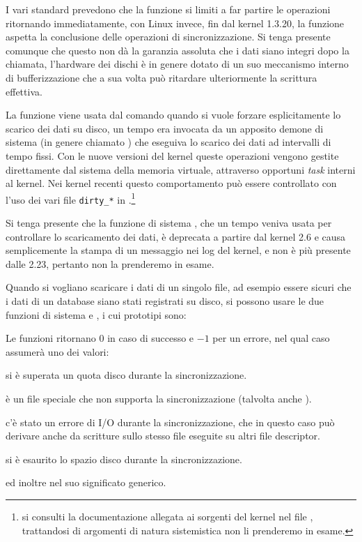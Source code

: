 I vari standard prevedono che la funzione si limiti a far partire le
operazioni ritornando immediatamente, con Linux invece, fin dal kernel 1.3.20,
la funzione aspetta la conclusione delle operazioni di sincronizzazione. Si
tenga presente comunque che questo non dà la garanzia assoluta che i dati
siano integri dopo la chiamata, l'hardware dei dischi è in genere dotato di un
suo meccanismo interno di bufferizzazione che a sua volta può ritardare
ulteriormente la scrittura effettiva.

La funzione viene usata dal comando  quando si vuole forzare
esplicitamente lo scarico dei dati su disco, un tempo era invocata da un
apposito demone di sistema (in genere chiamato ) che eseguiva lo
scarico dei dati ad intervalli di tempo fissi.  Con le nuove versioni del
kernel queste operazioni vengono gestite direttamente dal sistema della
memoria virtuale, attraverso opportuni \textit{task} interni al kernel. Nei
kernel recenti questo comportamento può essere controllato con l'uso dei vari
file \texttt{dirty\_*} in .\footnote{si consulti la
  documentazione allegata ai sorgenti del kernel nel file
  , trattandosi di argomenti di natura
  sistemistica non li prenderemo in esame.}

Si tenga presente che la funzione di sistema , che un tempo
veniva usata per controllare lo scaricamento dei dati, è deprecata a partire
dal kernel 2.6 e causa semplicemente la stampa di un messaggio nei log del
kernel, e non è più presente dalle  2.23, pertanto non la
prenderemo in esame.

Quando si vogliano scaricare i dati di un singolo file, ad esempio essere
sicuri che i dati di un database siano stati registrati su disco, si possono
usare le due funzioni di sistema  e , i cui
prototipi sono:

\begin{funcproto}{
}

{Le funzioni ritornano $0$ in caso di successo e $-1$ per un errore, nel qual
  caso  assumerà uno dei valori: 
  \begin{errlist}
  \item[\errcode{EDQUOT}] si è superata un quota disco durante la
    sincronizzazione.
  \item[\errcode{EINVAL}]  è un file speciale che non supporta la
    sincronizzazione (talvolta anche ).
  \item[\errcode{EIO}] c'è stato un errore di I/O durante la sincronizzazione,
    che in questo caso può derivare anche da scritture sullo stesso file
    eseguite su altri file descriptor.
  \item[\errcode{ENOSPC}] si è esaurito lo spazio disco durante la
    sincronizzazione.
  \end{errlist}
  ed inoltre  nel suo significato generico.}
\end{funcproto}

